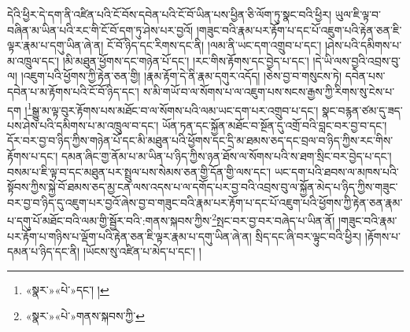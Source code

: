 དེའི་ཕྱིར་དེ་དག་ནི་འཛིན་པའི་ངོ་བོས་དབེན་པའི་ངོ་བོ་ཡིན་པས་ཕྱིན་ཅི་ལོག་ཏུ་སྣང་བའི་ཕྱིར། ཡུལ་ཇི་ལྟ་བ་བཞིན་མ་ཡིན་པའི་རང་གི་ངོ་བོ་དག་ཏུ་ཤེས་པར་བྱའོ། །གཟུང་བའི་རྣམ་པར་རྟོག་པ་དང་པོ་འཇུག་པའི་རྟེན་ཅན་ཇི་ལྟར་རྣམ་པ་དགུ་ཡིན་ཞེ་ན། ངོ་བོ་ཉིད་དང་རིགས་དང་ནི། །ལམ་ནི་ཡང་དག་འགྲུབ་པ་དང་། །ཤེས་པའི་དམིགས་པ་མ་འཁྲུལ་དང་། །མི་མཐུན་ཕྱོགས་དང་གཉེན་པོ་དང་། །རང་གིས་རྟོགས་དང་བྱེད་པ་དང་། །དེ་ཡི་ལས་བྱའི་འབྲས་བུ་ལ། །འཇུག་པའི་ཕྱོགས་ཀྱི་རྟེན་ཅན་གྱི། །རྣམ་རྟོག་དེ་ནི་རྣམ་དགུར་འདོད། །ཅེས་བྱ་བ་གསུངས་ཏེ། དབེན་པས་དབེན་པ་མ་རྟོགས་པའི་ངོ་བོ་ཉིད་དང་། ས་མི་གཡོ་བ་ལ་སོགས་པ་ལ་འཇུག་པས་སངས་རྒྱས་ཀྱི་རིགས་སུ་ངེས་པ་དག །\footnote{«སྣར་»«པེ་»དང་། །}སྒྱུ་མ་ལྟ་བུར་རྟོགས་པས་མཐོང་བ་ལ་སོགས་པའི་ལམ་ཡང་དག་པར་འགྲུབ་པ་དང་། སྣང་བརྙན་ཙམ་དུ་ཟད་པས་ཤེས་པའི་དམིགས་པ་མ་འཁྲུལ་བ་དང་། ཡོན་ཏན་དང་སྐྱོན་མཐོང་བ་སྔོན་དུ་འགྲོ་བའི་བླང་བར་བྱ་བ་དང་། དོར་བར་བྱ་བ་ཉིད་ཀྱིས་གཉེན་པོ་དང་མི་མཐུན་པའི་ཕྱོགས་དང་དྲི་མ་ཐམས་ཅད་དང་བྲལ་བ་ཉིད་ཀྱིས་རང་གིས་རྟོགས་པ་དང་། དམན་ཞིང་གྱ་ནོམ་པ་མ་ཡིན་པ་ཉིད་ཀྱིས་ཉན་ཐོས་ལ་སོགས་པའི་ས་ཐག་སྲིང་བར་བྱེད་པ་དང་། བསམ་པ་ཇི་ལྟ་བ་དང་མཐུན་པར་སྤྲུལ་པས་སེམས་ཅན་གྱི་དོན་གྱི་ལས་དང་། ཡང་དག་པའི་ཐབས་ལ་མཁས་པའི་སྟོབས་ཀྱིས་སྐྱེ་བོ་ཐམས་ཅད་མྱ་ངན་ལས་འདས་པ་ལ་དགོད་པར་བྱ་བའི་འབྲས་བུ་ལ་སྐྱོན་མེད་པ་ཉིད་ཀྱིས་གཟུང་བར་བྱ་བ་ཉིད་དུ་འཇུག་པར་བྱའོ་ཞེས་བྱ་བ་གཟུང་བའི་རྣམ་པར་རྟོག་པ་དང་པོ་འཇུག་པའི་ཕྱོགས་ཀྱི་རྟེན་ཅན་རྣམ་པ་དགུ་པོ་མཐོང་བའི་ལམ་གྱི་སྦྱོར་བའི་:གནས་སྐབས་ཀྱིས་\footnote{«སྣར་»«པེ་»གནས་སྐབས་ཀྱི་}སྤང་བར་བྱ་བར་བཞེད་པ་ཡིན་ནོ། །གཟུང་བའི་རྣམ་པར་རྟོག་པ་གཉིས་པ་ལྡོག་པའི་རྟེན་ཅན་ཇི་ལྟར་རྣམ་པ་དགུ་ཡིན་ཞེ་ན། སྲིད་དང་ཞི་བར་ལྟུང་བའི་ཕྱིར། །རྟོགས་པ་དམན་པ་ཉིད་དང་ནི། །ཡོངས་སུ་འཛིན་པ་མེད་པ་དང་། །
